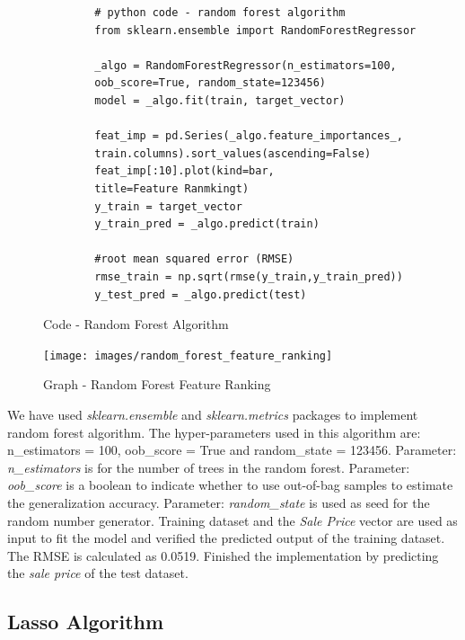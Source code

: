 \documentclass[sigconf]{acmart}
\begin{document}
	\begin{figure}[htb]
		\begin{verbatim}		
		# python code - random forest algorithm
		from sklearn.ensemble import RandomForestRegressor		
		
		_algo = RandomForestRegressor(n_estimators=100, 
		oob_score=True, random_state=123456)		
		model = _algo.fit(train, target_vector)  
		
		feat_imp = pd.Series(_algo.feature_importances_, 
		train.columns).sort_values(ascending=False)							
		feat_imp[:10].plot(kind=bar, 
		title=Feature Ranmkingt)		
		y_train = target_vector
		y_train_pred = _algo.predict(train)
		
		#root mean squared error (RMSE)
		rmse_train = np.sqrt(rmse(y_train,y_train_pred))			
		y_test_pred = _algo.predict(test)		
		\end{verbatim}
		\caption{Code - Random Forest Algorithm} \label{c:rf} 
	\end{figure}
	
	
	\begin{figure}[htb]
		\centering
		\texttt{[image: images/random\_forest\_feature\_ranking]}	
		\caption{Graph - Random Forest Feature Ranking} \label{fig:random-feature-ranking} 
	\end{figure}
	
	We have used {\em sklearn.ensemble} and {\em sklearn.metrics} packages to implement random forest algorithm. The hyper-parameters used in this algorithm are: n\_estimators = 100, oob\_score = True and random\_state = 123456. Parameter: {\em n\_estimators} is for the number of trees in the random forest. Parameter: {\em oob\_score} is a boolean to indicate whether to use out-of-bag samples to estimate the generalization accuracy. Parameter: {\em random\_state} is used as seed for the random number generator. Training dataset and the {\em Sale Price} vector are used as input to fit the model and verified the predicted output of the training dataset. The RMSE is calculated as 0.0519. Finished the implementation by predicting the {\em sale price} of the test dataset. 
	
	\subsection{Lasso Algorithm}
	
\end{document}

